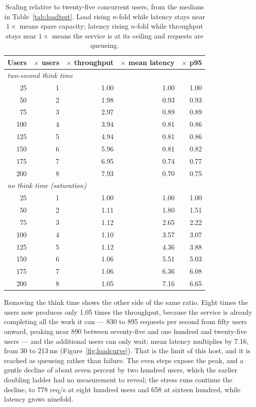 \documentclass[a4paper]{article}
\begin{document}
\begin{table}[H]
\centering
\caption{Scaling relative to twenty-five concurrent users, from the medians in
Table~\ref{tab:loadtest}. Load rising $n$-fold while latency stays near
$1\times$ means spare capacity; latency rising $n$-fold while throughput stays
near $1\times$ means the service is at its ceiling and requests are queueing.}
\label{tab:loadscale}
\small
\begin{tabular}{|r|r|r|r|r|}
\hline
\textbf{Users} & \textbf{$\times$ users} & \textbf{$\times$ throughput} & \textbf{$\times$ mean latency} & \textbf{$\times$ p95} \\
\hline
\multicolumn{5}{|l|}{\emph{two-second think time}} \\
\hline
 25 & 1 & 1.00 & 1.00 & 1.00 \\ \hline
 50 & 2 & 1.98 & 0.93 & 0.93 \\ \hline
 75 & 3 & 2.97 & 0.89 & 0.89 \\ \hline
100 & 4 & 3.94 & 0.81 & 0.86 \\ \hline
125 & 5 & 4.94 & 0.81 & 0.86 \\ \hline
150 & 6 & 5.96 & 0.81 & 0.82 \\ \hline
175 & 7 & 6.95 & 0.74 & 0.77 \\ \hline
200 & 8 & 7.93 & 0.70 & 0.75 \\ \hline
\multicolumn{5}{|l|}{\emph{no think time (saturation)}} \\
\hline
 25 & 1 & 1.00 & 1.00 & 1.00 \\ \hline
 50 & 2 & 1.11 & 1.80 & 1.51 \\ \hline
 75 & 3 & 1.12 & 2.65 & 2.22 \\ \hline
100 & 4 & 1.10 & 3.57 & 3.07 \\ \hline
125 & 5 & 1.12 & 4.36 & 3.88 \\ \hline
150 & 6 & 1.06 & 5.51 & 5.03 \\ \hline
175 & 7 & 1.06 & 6.36 & 6.08 \\ \hline
200 & 8 & 1.05 & 7.16 & 6.65 \\ \hline
\end{tabular}
\end{table}

Removing the think time shows the other side of the same ratio. Eight times the
users now produces only 1.05 times the throughput, because the service is
already completing all the work it can --- 830 to 895 requests per second from
fifty users onward, peaking near 890 between seventy-five and one hundred and
twenty-five users --- and the additional users can only wait: mean latency
multiplies by 7.16, from 30 to 213\,ms (Figure~\ref{fig:loadcurve}). That is the
limit of this host, and it is reached as queueing rather than failure. The even
steps expose the peak, and a gentle decline of about seven percent by two hundred
users, which the earlier doubling ladder had no measurement to reveal; the
stress runs continue the decline, to 778 req/s at eight hundred users and 658 at
sixteen hundred, while latency grows ninefold.
\end{document}
